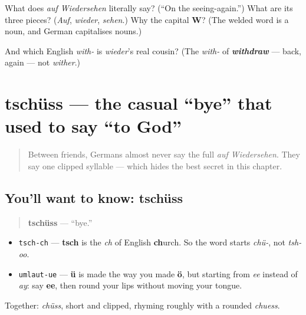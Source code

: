\begin{tcolorbox}[breakable,colback=teal!4,colframe=teal!35!black,title={Before you move on}]
What does \emph{auf Wiedersehen} literally say? (\textquotedblleft{}On the seeing-again.\textquotedblright{}) What are its three pieces? (\emph{Auf}, \emph{wieder}, \emph{sehen}.) Why the capital \textbf{W}? (The welded word is a noun, and German capitalises nouns.)

And which English \emph{with-} is \emph{wieder}'s real cousin? (The \emph{with-} of \emph{\textbf{withdraw}} — back, again — not \emph{wither}.)
\end{tcolorbox}
\section[tschüss]{tschüss — the casual \textquotedblleft{}bye\textquotedblright{} that used to say \textquotedblleft{}to God\textquotedblright{}}

\label{lesson:GE-C04-tschuss}



\begin{quote}
Between friends, Germans almost never say the full \emph{auf Wiedersehen}. They say one clipped syllable — which hides the best secret in this chapter.
\end{quote}

\subsection*{You'll want to know: tschüss}
\begin{quote}
\textbf{tschüss} — \textquotedblleft{}bye.\textquotedblright{}
\end{quote}

\begin{sounds}
\begin{itemize}
\raggedright
  \item \texttt{tsch-ch} — \textbf{tsch} is the \emph{ch} of English \textbf{ch}urch. So the word starts \emph{chü-}, not \emph{tsh-oo}.
  \item \texttt{umlaut-ue} — \textbf{ü} is made the way you made \textbf{ö}, but starting from \emph{ee} instead of \emph{ay}: say \textbf{ee}, then round your lips without moving your tongue.
\end{itemize}

Together: \emph{chüss}, short and clipped, rhyming roughly with a rounded \emph{chuess}.
\end{sounds}


